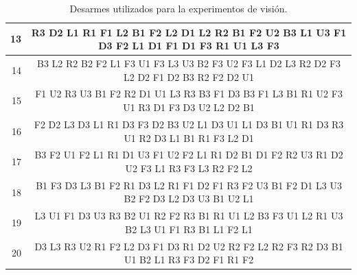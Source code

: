 {\begin{table}[h!]
{\begin{tabular}{|r|c|}
		13 & R3 D2 L1 R1 F1 L2 B1 F2 L2 D1 L2 R2 B1 F2 U2 B3 L1 U3 F1 D3 F2 L1 D1 F1 D1 F3 R1 U1 L3 F3 \\ \hline
		14 & B3 L2 R2 B2 F2 L1 F3 U1 F3 L3 U3 B2 F3 U2 F3 L1 D2 L3 R2 D2 F3 L2 D2 F1 D2 B3 R2 F2 D2 U1 \\ \hline
		15 & F1 U2 R3 U3 B1 F2 R2 D1 U1 L3 R3 B3 F1 D3 B3 F1 L3 B1 R1 U2 F3 U1 R3 D1 F3 D3 U2 L2 D2 B1 \\ \hline
		16 & F2 D2 L3 D3 L1 R1 D3 F3 D2 B3 U2 L1 D3 U1 L1 D3 B1 U1 R1 D3 R3 U1 R2 D3 L1 B1 R1 F3 L2 D1 \\ \hline
		17 & B3 F2 U1 F2 L1 R1 D1 U3 F1 U2 F2 L1 R1 D2 B1 D1 F2 R2 U3 R1 D2 U2 F3 L1 R3 F3 L3 R2 F2 L2 \\ \hline
		18 & B1 F3 D3 L3 B1 F2 R1 D3 L2 R1 F1 D2 F1 R3 F2 U3 B1 F2 D1 L3 U3 B2 F2 D3 L2 D3 U3 B1 U2 L1 \\ \hline
		19 & L3 U1 F1 D3 U3 R3 B2 U1 R2 F2 R3 B1 R1 U1 L2 B3 F3 U1 L2 R1 U3 B2 L3 U1 F1 R3 B1 L1 F2 L1 \\ \hline
		20 & D3 L3 R3 U2 R1 F2 L2 D3 F1 D3 R1 D2 U2 R2 F2 L2 R2 F3 R2 D3 B1 U1 B2 L1 R3 F3 D2 F1 R1 F2 \\ \hline
	\end{tabular}
	}
	\caption{Desarmes utilizados para la experimentos de visión.}
	\label{vision}
\end{table}

}

